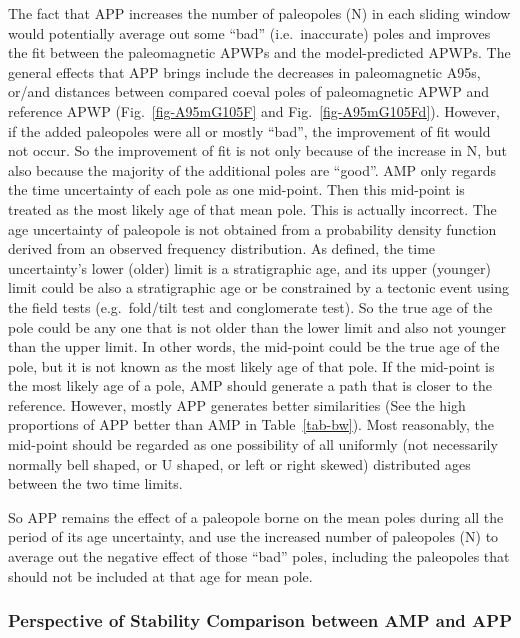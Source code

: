 The fact that APP increases the number of paleopoles (N) in each sliding window
would potentially average out some ``bad'' (i.e.\ inaccurate) poles and improves
the fit between the paleomagnetic APWPs and the model-predicted APWPs. The
general effects that APP brings include the decreases in paleomagnetic A95s,
or/and distances between compared coeval poles of paleomagnetic APWP and
reference APWP (Fig.~\ref{fig-A95mG105F} and Fig.~\ref{fig-A95mG105Fd}).
However, if the added paleopoles were all or mostly ``bad'', the improvement of
fit would not occur. So the improvement of fit is not only because of the
increase in N, but also because the majority of the additional poles are
``good''. AMP only regards the time uncertainty of each pole as one mid-point.
Then this mid-point is treated as the most likely age of that mean pole. This is
actually incorrect. The age uncertainty of paleopole is not obtained from a
probability density function derived from an observed frequency distribution. As
defined, the time uncertainty's lower (older) limit is a stratigraphic age, and
its upper (younger) limit could be also a stratigraphic age or be constrained by
a tectonic event using the field tests (e.g.\ fold/tilt test and conglomerate
test). So the true age of the pole could be any one that is not older than the
lower limit and also not younger than the upper limit. In other words, the
mid-point could be the true age of the pole, but it is not known as the most
likely age of that pole. If the mid-point is the most likely age of a pole, AMP
should generate a path that is closer to the reference. However, mostly APP
generates better similarities (See the high proportions of APP better than AMP
in Table~\ref{tab-bw}). Most reasonably, the mid-point should be regarded as
one possibility of all uniformly (not necessarily normally bell shaped, or U
shaped, or left or right skewed) distributed ages between the two time limits.

So APP remains the effect of a paleopole borne on the mean poles during all the
period of its age uncertainty, and use the increased number of paleopoles (N)
to average out the negative effect of those ``bad'' poles, including the
paleopoles that should not be included at that age for mean pole.

\subsubsection{Perspective of Stability Comparison between AMP and APP}


